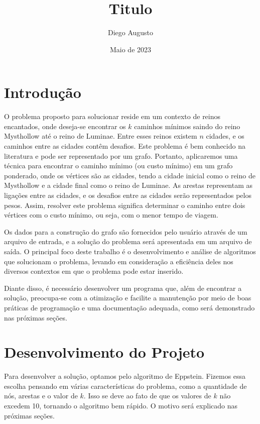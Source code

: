 \documentclass[12pt]{article}
\title{Titulo}
\date{Maio de 2023}
\author{Diego Augusto}
\begin{document}

    \maketitle
    \newpage
    \section{Introdução}
    O problema proposto para solucionar reside em um contexto de reinos
    encantados, onde deseja-se encontrar os $k$ caminhos mínimos saindo do reino Mysthollow até o reino de Luminae. Entre esses
    reinos existem $n$ cidades, e os caminhos entre as cidades contêm desafios. Este
    problema é bem conhecido na literatura e pode ser representado por um grafo.
    Portanto, aplicaremos uma técnica para encontrar o caminho mínimo (ou custo
    mínimo) em um grafo ponderado, onde os vértices são as cidades, tendo a
    cidade inicial como o reino de Mysthollow e a cidade final como o reino de
    Luminae. As arestas representam as ligações entre as cidades, e os desafios
    entre as cidades serão representados pelos pesos. Assim, resolver este
    problema significa determinar o caminho entre dois vértices com o custo
    mínimo, ou seja, com o menor tempo de viagem.

    Os dados para a construção do grafo são fornecidos pelo usuário através de um
    arquivo de entrada, e a solução do problema será apresentada em um arquivo de
    saída. O principal foco deste trabalho é o desenvolvimento e análise de
    algoritmos que solucionam o problema, levando em consideração a eficiência deles
    nos diversos contextos em que o problema pode estar inserido. 

    Diante disso, é necessário desenvolver um programa que, além de encontrar a
    solução, preocupa-se com a otimização e facilite a manutenção por meio de boas
    práticas de programação e uma documentação adequada, como será demonstrado nas
    próximas seções.

    \newpage

    \section{Desenvolvimento do Projeto}
    Para desenvolver a solução, optamos pelo algoritmo de Eppstein. Fizemos essa
    escolha pensando em várias características do problema, como a quantidade de
    nós, arestas e o valor de $k$. Isso se deve ao fato de que os valores de $k$
    não excedem 10, tornando o algoritmo bem rápido. O motivo será explicado nas
    próximas seções.
\end{document}
